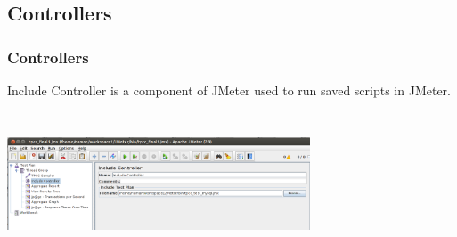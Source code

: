 \documentclass[12pt]{beamer}
\begin{document}
\subsection{Controllers}
\begin{frame}[c]
\frametitle{Controllers}
Include Controller is a component of JMeter used to run saved scripts in JMeter.\\
\centering
   \includegraphics[width=9cm, height=5cm]{images/tpccgui2}

\end{frame}


\end{document}
